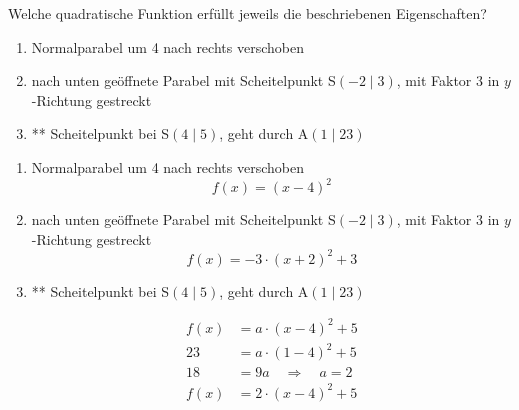 \documentclass[a4paper,ngerman,12pt]{exam}
\begin{document}
\begin{questions}
\begin{solution}
  \end{solution}
  \question %
  Welche quadratische Funktion erfüllt jeweils die beschriebenen Eigenschaften?\newline

  \hspace{1cm}\begin{minipage}{0.9\textwidth}
    \begin{enumerate}[label=\alph*)]
      \item Normalparabel um 4 nach rechts verschoben
      \item nach unten geöffnete Parabel mit Scheitelpunkt S$(-2\mid3)$, mit Faktor 3 in $y$-Richtung gestreckt
      \item ** Scheitelpunkt bei S$(4\mid5)$, geht durch A$(1\mid23)$
    \end{enumerate}
  \end{minipage}

  \begin{solution}
    \begin{enumerate}[label=\alph*)]
      \item Normalparabel um 4 nach rechts verschoben
            \begin{equation*}
              f(x)=(x-4)^2
            \end{equation*}

      \item nach unten geöffnete Parabel mit Scheitelpunkt S$(-2\mid3)$, mit Faktor 3 in $y$-Richtung gestreckt
            \begin{equation*}
              f(x)=-3\cdot(x+2)^2+3
            \end{equation*}
      \item ** Scheitelpunkt bei S$(4\mid5)$, geht durch A$(1\mid23)$


            \begin{align*}
              f(x) & =a\cdot(x-4)^2+5             \\[3mm]
              23   & =a\cdot(1-4)^2+5             \\
              18   & =9a\quad\Rightarrow\quad a=2 \\[3mm]
              f(x) & =2\cdot(x-4)^2+5
            \end{align*}

    \end{enumerate}
  \end{solution}

\end{questions}
\end{document}
